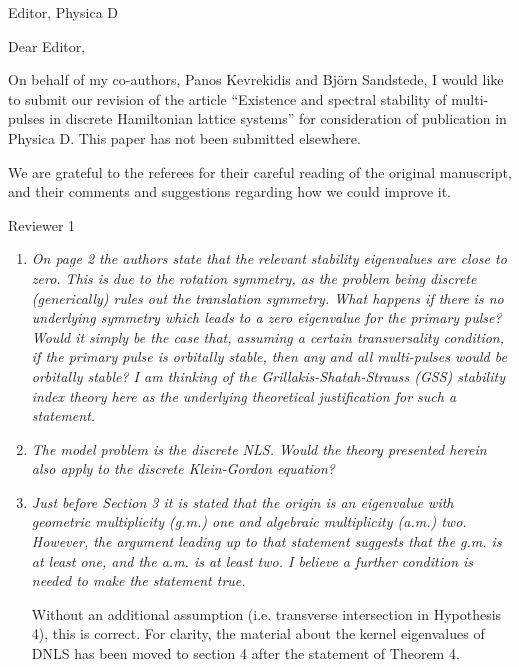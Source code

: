 \documentclass[11pt]{letter}
\begin{document}
\address{Ross Parker \\
Division of Applied Mathematics \\
Brown University \\
Providence, RI 02912 \\
\texttt{ross\_parker@brown.edu}}%
\signature{Ross Parker}
\begin{letter}{Editor, Physica D}

\opening{Dear Editor,}

On behalf of my co-authors, Panos Kevrekidis and Bj\"orn Sandstede, I would like to submit our revision of the article ``Existence and spectral stability of multi-pulses in discrete Hamiltonian lattice systems'' for consideration of publication in Physica D. This paper has not been submitted elsewhere.

We are grateful to the referees for their careful reading of the original manuscript, and their comments and suggestions regarding how we could improve it. 

Reviewer 1
\begin{enumerate}
\item \emph{On page 2 the authors state that the relevant stability eigenvalues are close to zero. This is due to the rotation symmetry, as the problem being discrete (generically) rules out the translation symmetry. What happens if there is no underlying symmetry which leads to a zero eigenvalue for the primary pulse? Would it simply be the case that, assuming a certain transversality condition, if the primary pulse is orbitally stable, then any and all multi-pulses would be orbitally stable? I am thinking of the Grillakis-Shatah-Strauss (GSS) stability index theory here as the underlying theoretical justification for such a statement.}

\item \emph{The model problem is the discrete NLS. Would the theory presented herein also apply to the discrete Klein-Gordon equation?}

\item \emph{Just before Section 3 it is stated that the origin is an eigenvalue with geometric multiplicity (g.m.) one and algebraic multiplicity (a.m.) two. However, the argument leading up to that statement suggests that the g.m. is at least one, and the a.m. is at least two. I believe a further condition is needed to make the statement true.}

Without an additional assumption (i.e. transverse intersection in Hypothesis 4), this is correct. For clarity, the material about the kernel eigenvalues of DNLS has been moved to section 4 after the statement of Theorem 4.


\end{enumerate}
\end{letter}
\end{document}
